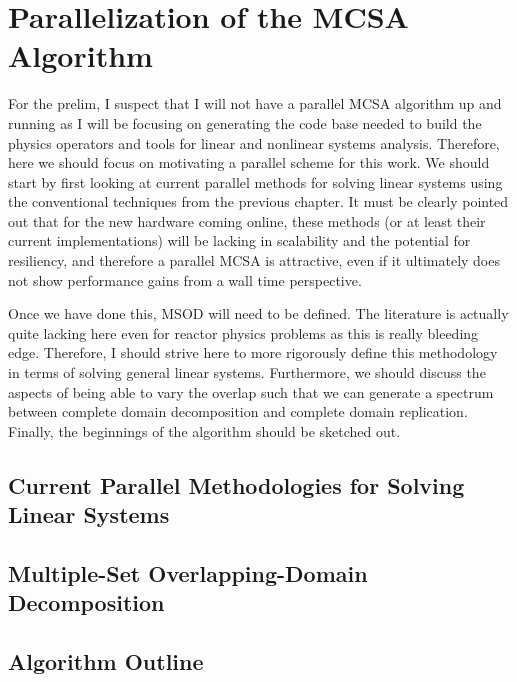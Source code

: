 \chapter{Parallelization of the MCSA Algorithm}
\label{ch:parallel_mcsa}

For the prelim, I suspect that I will not have a parallel MCSA
algorithm up and running as I will be focusing on generating the code
base needed to build the physics operators and tools for linear and
nonlinear systems analysis. Therefore, here we should focus on
motivating a parallel scheme for this work. We should start by first
looking at current parallel methods for solving linear systems using
the conventional techniques from the previous chapter. It must be
clearly pointed out that for the new hardware coming online, these
methods (or at least their current implementations) will be lacking in
scalability and the potential for resiliency, and therefore a parallel
MCSA is attractive, even if it ultimately does not show performance
gains from a wall time perspective.

Once we have done this, MSOD will need to be defined. The literature
is actually quite lacking here even for reactor physics problems as
this is really bleeding edge. Therefore, I should strive here to more
rigorously define this methodology in terms of solving general linear
systems. Furthermore, we should discuss the aspects of being able to
vary the overlap such that we can generate a spectrum between complete
domain decomposition and complete domain replication. Finally, the
beginnings of the algorithm should be sketched out.

\section{Current Parallel Methodologies for Solving Linear Systems}
\label{sec:current_parallel_methods}

\section{Multiple-Set Overlapping-Domain Decomposition}
\label{sec:msod}

\section{Algorithm Outline}
\label{sec:parallel_mcsa_algorithm_outline}
